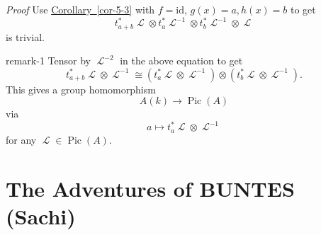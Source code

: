 \documentclass[10pt,]{book}
\makeatletter
\renewcommand*{\proofname}{Proof}
\renewenvironment{proof}[1][\proofname]{\par
  \pushQED{\qed}%
  \normalfont \topsep6\p@\@plus6\p@\relax
  \trivlist
  \item\relax
    {\itshape
    #1\@addpunct{.}}\hspace\labelsep\ignorespaces
}{%
  \popQED\endtrivlist\@endpefalse
}
\numberwithin{equation}{section}
\newcommand{\sheaf}[1]{\operatorname{\mathcal{#1}}}
\newcommand{\id}{\mathrm{id}}
\DeclareMathOperator{\Pic}{Pic}
\makeatother
\begin{document}
\begin{proof}\hypertarget{proof-22}{}
\hypertarget{p-131}{}%
Use \hyperref[cor-5-3]{Corollary~\ref{cor-5-3}} with \(f=  \id\), \(g(x)  = a, h(x) = b\) to get%
\begin{equation*}
t_{a+b}^*\sheaf L \otimes t_{a}^*\sheaf L ^{-1}\otimes t_b^* \sheaf L ^{-1} \otimes \sheaf L
\end{equation*}
is trivial.%
\end{proof}
\begin{remark}{}{remark-1}%
\hypertarget{p-132}{}%
Tensor by \(\sheaf L^{-2}\) in the above equation to get%
\begin{equation*}
t_{a+b}^*\sheaf L \otimes\sheaf L^{-1} \cong ( t_{a}^*\sheaf L \otimes \sheaf L^{-1}) \otimes(t_b^* \sheaf L\otimes \sheaf L^{-1})\text{.}
\end{equation*}
This gives a group homomorphism%
\begin{equation*}
A(k) \to \Pic(A)
\end{equation*}
via%
\begin{equation*}
a\mapsto t_a^*\sheaf L \otimes \sheaf L^{-1}
\end{equation*}
for any \(\sheaf L \in \Pic(A)\).%
\end{remark}
%
%
\typeout{************************************************}
\typeout{************************************************}
%
\section[{The Adventures of BUNTES (Sachi)}]{The Adventures of BUNTES (Sachi)}\label{sec-adventures-buntes}
%
%
\typeout{************************************************}
\typeout{************************************************}
%
\end{document}
